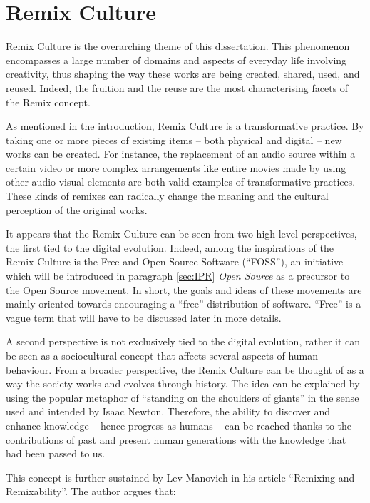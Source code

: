 \chapter{Remix Culture}
\label{ch:ch1_RemixCulture}


Remix Culture is the overarching theme of this dissertation. This phenomenon encompasses a large number of domains and aspects of everyday life involving creativity, thus shaping the way these works are being created, shared, used, and reused. Indeed, the fruition and the reuse are the most characterising facets of the Remix concept.

As mentioned in the introduction, Remix Culture is a transformative practice. By taking one or more pieces of existing items – both physical and digital – new works can be created. For instance, the replacement of an audio source within a certain video or more complex arrangements like entire movies made by using other audio-visual elements are both valid examples of transformative practices. These kinds of remixes can radically change the meaning and the cultural perception of the original works.

It appears that the Remix Culture can be seen from two high-level perspectives, the first tied to the digital evolution. Indeed, among the inspirations of the Remix Culture is the Free and Open Source-Software (“FOSS”), an initiative which will be introduced in paragraph \ref{sec:IPR} \emph{Open Source} as a precursor to the Open Source movement. In short, the goals and ideas of these movements are mainly oriented towards encouraging a “free” distribution of software. “Free” is a vague term that will have to be discussed later in more details.

A second perspective is not exclusively tied to the digital evolution, rather it can be seen as a sociocultural concept that affects several aspects of human behaviour. From a broader perspective, the Remix Culture can be thought of as a way the society works and evolves through history. The idea can be explained by using the popular metaphor of “standing on the shoulders of giants” in the sense used and intended by Isaac Newton. Therefore, the ability to discover and enhance knowledge – hence progress as humans – can be reached thanks to the contributions of past and present human generations with the knowledge that had been passed to us.

This concept is further sustained by Lev Manovich in his article “Remixing and Remixability”. The author argues that:

